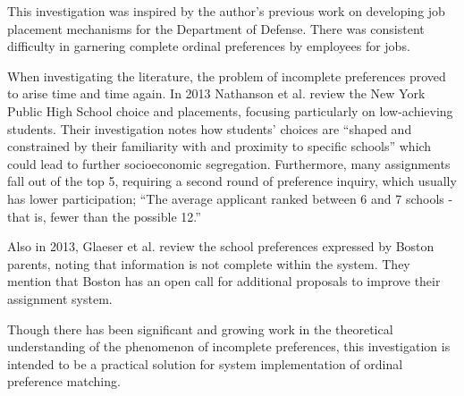This investigation was inspired by the author's previous work on developing job placement mechanisms for the Department of Defense. There was consistent difficulty in garnering complete ordinal preferences by employees for jobs.

When investigating the literature, the problem of incomplete preferences proved to arise time and time again.  In 2013 Nathanson et al. review the New York Public High School choice and placements, focusing particularly on low-achieving students. \cite{2013_Nathanson} Their investigation notes how students' choices are ``shaped and constrained by their familiarity with and proximity to specific schools'' which could lead to further socioeconomic segregation. Furthermore, many assignments fall out of the top 5, requiring a second round of preference inquiry, which usually has lower participation; ``The average applicant ranked between 6 and 7 schools - that is, fewer than the possible 12.''  

Also in 2013, Glaeser et al. review the school preferences expressed by Boston parents, noting that information is not complete within the system.\cite{2013_Glaeser} They mention that Boston has an open call for additional proposals to improve their assignment system. 

Though there has been significant and growing work in the theoretical understanding of the phenomenon of incomplete preferences\cite{2016_Cettolin}\cite{2016_McClellon}, this investigation is intended to be a practical solution for system implementation of ordinal preference matching.